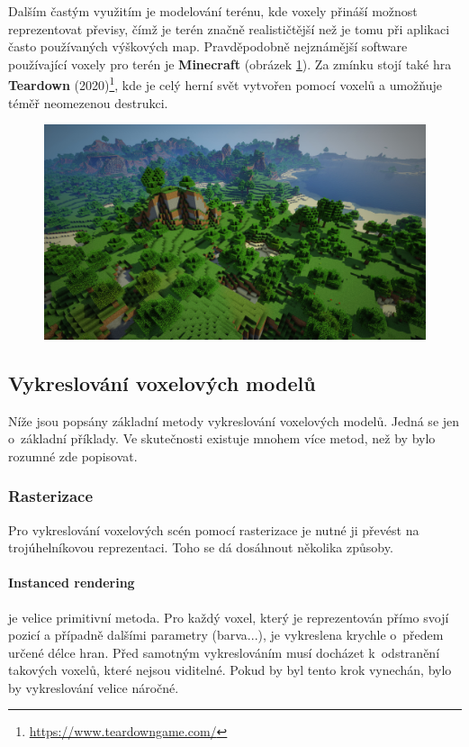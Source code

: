 Dalším častým využitím je modelování terénu, kde voxely přináší možnost reprezentovat převisy, čímž je terén značně realističtější než je tomu při aplikaci často používaných výškových map. Pravděpodobně nejznámější software používající voxely pro terén je \textbf{Minecraft} (obrázek \ref{fig:minecraft}). Za zmínku stojí také hra \textbf{Teardown} (2020)\footnote{\url{https://www.teardowngame.com/}}, kde je celý herní svět vytvořen pomocí voxelů a umožňuje téměř neomezenou destrukci.

\begin{figure}[H]
	\centering
	\includegraphics[scale=0.13]{obrazky-figures/minecraft.jpg}
	\captionsetup{justification=centering}
	\label{fig:minecraft}
\end{figure}

\subsection{Vykreslování voxelových modelů}\label{sec:voxel_render}
Níže jsou popsány základní metody vykreslování voxelových modelů. Jedná se jen o~základní příklady. Ve skutečnosti existuje mnohem více metod, než by bylo rozumné zde popisovat.

\subsubsection{Rasterizace}
Pro vykreslování voxelových scén pomocí rasterizace je nutné ji převést na trojúhelníkovou reprezentaci. Toho se dá dosáhnout několika způsoby.

\paragraph{Instanced rendering} je velice primitivní metoda. Pro každý voxel, který je reprezentován přímo svojí pozicí a případně dalšími parametry (barva...), je vykreslena krychle o~předem určené délce hran. Před samotným vykreslováním musí docházet k~odstranění takových voxelů, které nejsou viditelné. Pokud by byl tento krok vynechán, bylo by vykreslování velice náročné. \cite{nousiainen_2019}

